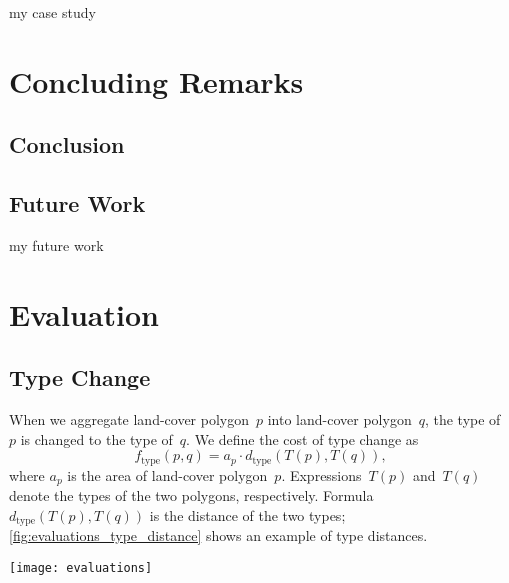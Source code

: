 \documentclass[ijgi,article,submit,moreauthors,pdftex]{Definitions/mdpi}
\begin{document}
my case study





\section{Concluding Remarks}
\label{sec:concluding_remarks}

\subsection{Conclusion}



\subsection{Future Work}

my future work

\section{Evaluation}

\subsection{Type Change}

When we aggregate land-cover polygon~$p$ into land-cover polygon~$q$,
the type of~$p$ is changed to the type of~$q$.  
We define the cost of type change as
\begin{equation}
\label{eq:f_type}
f_\mathrm{type}(p,q)=a_p \cdot d_\mathrm{type}(T(p),T(q)),
\end{equation}
where $a_p$ is the area of land-cover polygon~$p$. 
Expressions~$T(p)$ and~$T(q)$ denote the types of the two polygons, respectively.
Formula~$d_\mathrm{type}(T(p),T(q))$ is the distance of the two types;
\fig\ref{fig:evaluations_type_distance} shows an example of type distances.

\begin{figure*}[tb]
\centering
\texttt{[image: evaluations]}
\caption{An example of type distances of land-cover polygons, 
    where each color represents a type.
}
\label{fig:evaluations_type_distance}
\end{figure*}
\end{document}
